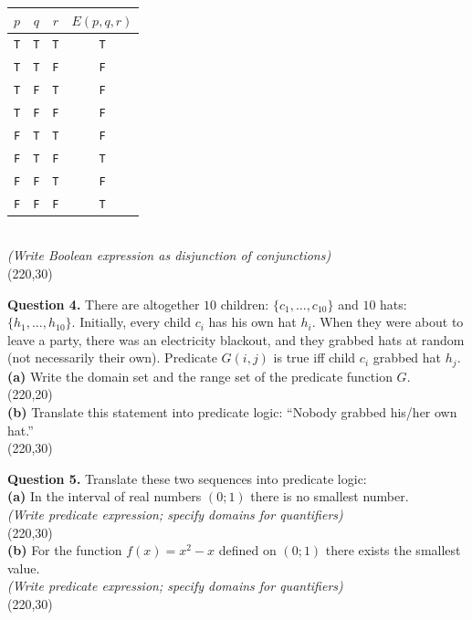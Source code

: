 \documentclass[jou]{apa6}
\begin{document}
\begin{tabular}{ c | c | c | c }
$p$ & $q$ & $r$ & $E(p,q,r)$ \\ \hline
{\tt T} & {\tt T} & {\tt T} & {\tt T} \\ \hline
{\tt T} & {\tt T} & {\tt F} & {\tt F} \\ \hline
{\tt T} & {\tt F} & {\tt T} & {\tt F} \\ \hline
{\tt T} & {\tt F} & {\tt F} & {\tt F} \\ \hline
{\tt F} & {\tt T} & {\tt T} & {\tt F} \\ \hline
{\tt F} & {\tt T} & {\tt F} & {\tt T} \\ \hline
{\tt F} & {\tt F} & {\tt T} & {\tt F} \\ \hline
{\tt F} & {\tt F} & {\tt F} & {\tt T} \\ \hline
\end{tabular}\\
{\scriptsize \em (Write Boolean expression as disjunction of conjunctions)}\\
\framebox(220,30){}


{\bf Question 4.} There are altogether $10$ children: $\{ c_1,\ldots,c_{10} \}$ and 
$10$ hats: $\{ h_1,\ldots,h_{10} \}$. Initially, every child $c_i$ has his own hat $h_i$.
When they were about to leave a party, there was an electricity 
blackout, and they grabbed hats at random (not necessarily their own). 
Predicate $G(i,j)$ is true iff child $c_i$ grabbed hat $h_j$.\\
{\bf (a)} Write the domain set and the range set of the 
predicate function $G$.\\
\framebox(220,20){}\\
{\bf (b)} Translate this statement into predicate logic: ``Nobody grabbed his/her own hat.''\\
\framebox(220,30){}


{\bf Question 5.} Translate these two sequences into predicate logic:\\
{\bf (a)} In the interval of real numbers $(0;1)$ there is no smallest number.\\
{\scriptsize \em (Write predicate expression; specify domains for quantifiers)}\\
\framebox(220,30){}\\
{\bf (b)} For the function $f(x) = x^2 - x$ defined on $(0;1)$ there exists the smallest value.\\
{\scriptsize \em (Write predicate expression; specify domains for quantifiers)}\\
\framebox(220,30){}
\end{document}
